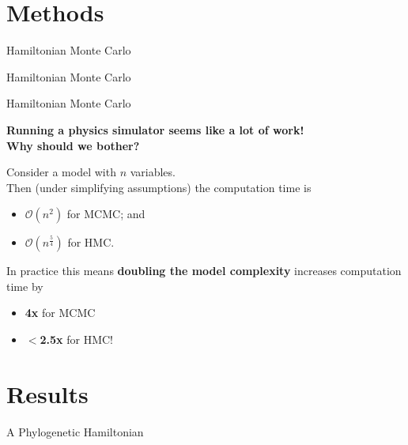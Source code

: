 \documentclass{beamer}
\begin{document}
    \section{Methods}

    \begin{frame}{Hamiltonian Monte Carlo}
    \end{frame}

    \begin{frame}{Hamiltonian Monte Carlo}
    \end{frame}

    \begin{frame}{Hamiltonian Monte Carlo}

        \textbf{Running a physics simulator seems like a lot of work! \\ Why should we bother?}

        \begin{theorem}[Creutz 1988]
            Consider a model with $n$ variables. \\
            Then (under simplifying assumptions) the computation time is
            \begin{itemize}
                \item $\mathcal{O}\left(n^2\right)$ for MCMC; and
                \item $\mathcal{O}\left(n^\frac{5}{4}\right)$ for HMC.
            \end{itemize}
        \end{theorem}

        In practice this means \textbf{doubling the model complexity} increases computation time by
        \begin{itemize}
            \item \textbf{4x} for MCMC
            \item \textbf{$<$2.5x} for HMC!
        \end{itemize}

    \end{frame}

    \section{Results}

    \begin{frame}{A Phylogenetic Hamiltonian}
    \end{frame}
\end{document}
